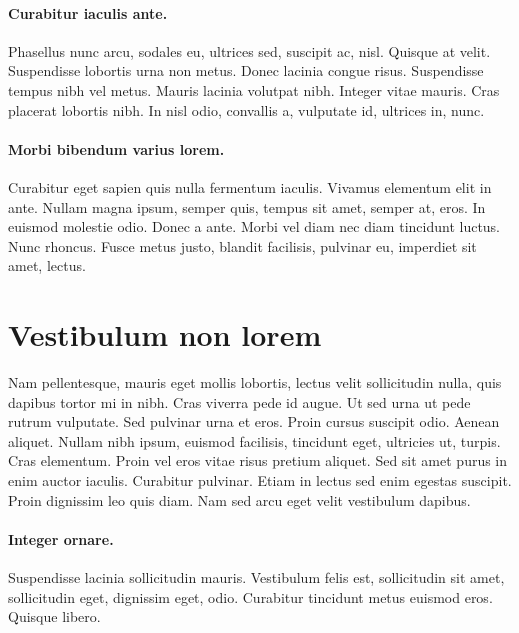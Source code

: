 \paragraph*{Curabitur iaculis ante.}
Phasellus nunc arcu, sodales eu, ultrices sed, suscipit ac, nisl. Quisque at velit. Suspendisse lobortis urna non metus. Donec lacinia congue risus. Suspendisse tempus nibh vel metus. Mauris lacinia volutpat nibh. Integer vitae mauris. Cras placerat lobortis nibh. In nisl odio, convallis a, vulputate id, ultrices in, nunc. 

\paragraph*{Morbi bibendum varius lorem.}
Curabitur eget sapien quis nulla fermentum iaculis. Vivamus elementum elit in ante. Nullam magna ipsum, semper quis, tempus sit amet, semper at, eros. In euismod molestie odio. Donec a ante. Morbi vel diam nec diam tincidunt luctus. Nunc rhoncus. Fusce metus justo, blandit facilisis, pulvinar eu, imperdiet sit amet, lectus.



%
%
\section[Vestibulum non lorem]{
	Vestibulum non lorem
}


Nam pellentesque, mauris eget mollis lobortis, lectus velit sollicitudin nulla, quis dapibus tortor mi in nibh. Cras viverra pede id augue. Ut sed urna ut pede rutrum vulputate. Sed pulvinar urna et eros. Proin cursus suscipit odio. Aenean aliquet. Nullam nibh ipsum, euismod facilisis, tincidunt eget, ultricies ut, turpis. Cras elementum. Proin vel eros vitae risus pretium aliquet. Sed sit amet purus in enim auctor iaculis. Curabitur pulvinar. Etiam in lectus sed enim egestas suscipit. Proin dignissim leo quis diam. Nam sed arcu eget velit vestibulum dapibus. 

\paragraph*{Integer ornare.}
Suspendisse lacinia sollicitudin mauris. Vestibulum felis est, sollicitudin sit amet, sollicitudin eget, dignissim eget, odio. Curabitur tincidunt metus euismod eros. Quisque libero.

